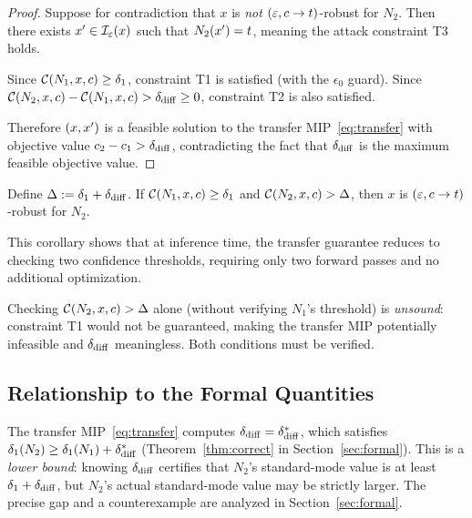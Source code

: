 \begin{proof}
  Suppose for contradiction that $x$ is \emph{not} $(\varepsilon,c\to t)$-robust for $N_2$. Then there exists $x' \in \mathcal{I}_\varepsilon(x)$ such that $N_2(x') = t$, meaning the attack constraint T3 holds.

  Since $\mathcal{C}(N_1,x,c) \ge \delta_1$, constraint T1 is satisfied (with the $\epsilon_0$ guard). Since $\mathcal{C}(N_2,x,c) - \mathcal{C}(N_1,x,c) > \delta_{\mathrm{diff}} \geq 0$, constraint T2 is also satisfied.

  Therefore $(x, x')$ is a feasible solution to the transfer MIP~\eqref{eq:transfer} with objective value $c_2 - c_1 > \delta_{\mathrm{diff}}$, contradicting the fact that $\delta_{\mathrm{diff}}$ is the maximum feasible objective value.
\end{proof}

\begin{corollary}
  \label{cor:single}
  Define $\Delta := \delta_1 + \delta_{\mathrm{diff}}$. If $\mathcal{C}(N_1,x,c) \ge \delta_1$ and $\mathcal{C}(N_2,x,c) > \Delta$, then $x$ is $(\varepsilon, c \to t)$-robust for $N_2$.
\end{corollary}

This corollary shows that at inference time, the transfer guarantee reduces to checking two confidence thresholds, requiring only two forward passes and no additional optimization.

\begin{remark}
  Checking $\mathcal{C}(N_2,x,c) > \Delta$ alone (without verifying $N_1$'s threshold) is \emph{unsound}: constraint T1 would not be guaranteed, making the transfer MIP potentially infeasible and $\delta_{\mathrm{diff}}$ meaningless. Both conditions must be verified.
\end{remark}

\subsection{Relationship to the Formal Quantities}

The transfer MIP~\eqref{eq:transfer} computes $\delta_{\mathrm{diff}} = \delta_{\mathrm{diff}}^{*}$, which satisfies $\delta_1(N_{2}) \geq \delta_1(N_{1}) + \delta_{\mathrm{diff}}^{*}$ (Theorem~\ref{thm:correct} in Section~\ref{sec:formal}). This is a \emph{lower bound}: knowing $\delta_{\mathrm{diff}}$ certifies that $N_2$'s standard-mode value is at least $\delta_1 + \delta_{\mathrm{diff}}$, but $N_2$'s actual standard-mode value may be strictly larger. The precise gap and a counterexample are analyzed in Section~\ref{sec:formal}.
